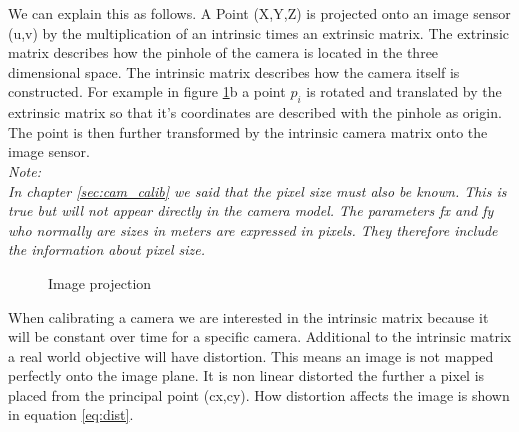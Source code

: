 \documentclass[11pt,a4paper,titlepage,oneside]{report}
\begin{document}
We can explain this as follows. A Point (X,Y,Z) is projected onto an image sensor (u,v) by the multiplication of an intrinsic times an extrinsic matrix. The extrinsic matrix describes how the pinhole of the camera is located in the three dimensional space. The intrinsic matrix describes how the camera itself is constructed. For example in figure \ref{fig:projection}b a point $p_i$ is rotated and translated by the extrinsic matrix so that it's coordinates are described with the pinhole as origin. The point is then further transformed by the intrinsic camera matrix onto the image sensor.\\
\em
Note:\\
In chapter \ref{sec:cam_calib} we said that the pixel size must also be known. This is true but will not appear directly in the camera model. The parameters fx and fy who normally are sizes in meters are expressed in pixels. They therefore include the information about pixel size.
\normalfont

\begin{figure}[H]
	\centering
	\caption{Image projection}\label{fig:projection}
\end{figure}

When calibrating a camera we are interested in the intrinsic matrix because it will be constant over time for a specific camera. Additional to the intrinsic matrix a real world objective will have distortion. This means an image is not mapped perfectly onto the image plane. It is non linear distorted the further a pixel is placed from the principal point (cx,cy). How distortion affects the image is shown in equation \ref{eq:dist}.
\end{document}
